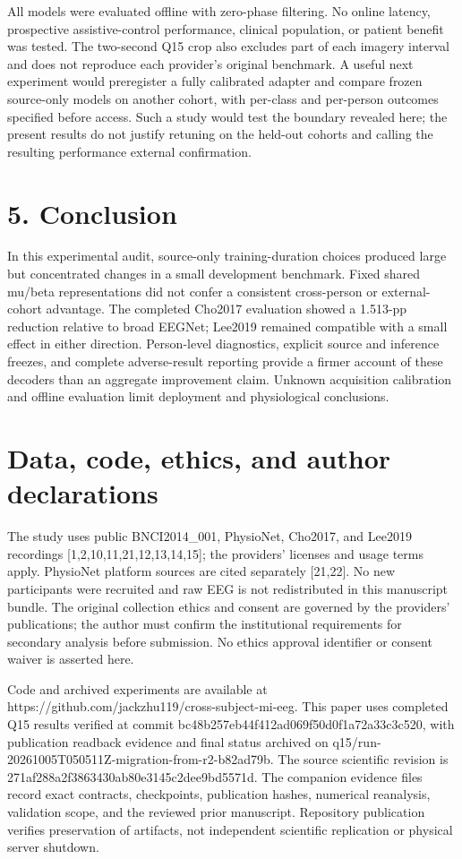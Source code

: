 \documentclass[11pt]{article}
\begin{document}
All models were evaluated offline with zero-phase filtering. No online latency, prospective assistive-control performance, clinical population, or patient benefit was tested. The two-second Q15 crop also excludes part of each imagery interval and does not reproduce each provider's original benchmark. A useful next experiment would preregister a fully calibrated adapter and compare frozen source-only models on another cohort, with per-class and per-person outcomes specified before access. Such a study would test the boundary revealed here; the present results do not justify retuning on the held-out cohorts and calling the resulting performance external confirmation.

\section*{5. Conclusion}
In this experimental audit, source-only training-duration choices produced large but concentrated changes in a small development benchmark. Fixed shared mu/beta representations did not confer a consistent cross-person or external-cohort advantage. The completed Cho2017 evaluation showed a 1.513-pp reduction relative to broad EEGNet; Lee2019 remained compatible with a small effect in either direction. Person-level diagnostics, explicit source and inference freezes, and complete adverse-result reporting provide a firmer account of these decoders than an aggregate improvement claim. Unknown acquisition calibration and offline evaluation limit deployment and physiological conclusions.

\section*{Data, code, ethics, and author declarations}
The study uses public BNCI2014\_001, PhysioNet, Cho2017, and Lee2019 recordings [1,2,10,11,21,12,13,14,15]; the providers' licenses and usage terms apply. PhysioNet platform sources are cited separately [21,22]. No new participants were recruited and raw EEG is not redistributed in this manuscript bundle. The original collection ethics and consent are governed by the providers' publications; the author must confirm the institutional requirements for secondary analysis before submission. No ethics approval identifier or consent waiver is asserted here.

Code and archived experiments are available at https://github.com/jackzhu119/cross-subject-mi-eeg. This paper uses completed Q15 results verified at commit bc48b257eb44f412ad069f50d0f1a72a33c3c520, with publication readback evidence and final status archived on q15/run-20261005T050511Z-migration-from-r2-b82ad79b. The source scientific revision is 271af288a2f3863430ab80e3145c2dee9bd5571d. The companion evidence files record exact contracts, checkpoints, publication hashes, numerical reanalysis, validation scope, and the reviewed prior manuscript. Repository publication verifies preservation of artifacts, not independent scientific replication or physical server shutdown.
\end{document}
